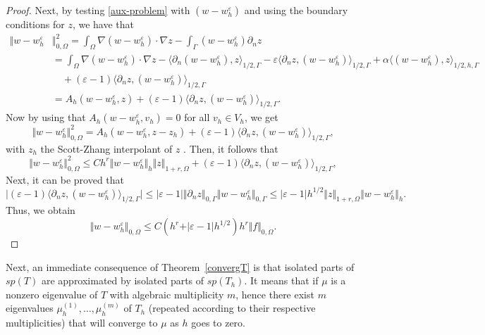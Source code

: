 \documentclass[onefignum,onetabnum,final]{siamart250211}
\numberwithin{equation}{section}
\newcommand\0{\boldsymbol{0}}
\renewcommand\O{\Omega}
\newcommand\G{\Gamma}
\begin{document}
\begin{proof}
		Next, by testing \eqref{aux-problem} with $(w-w_h^{\varepsilon})$
		and using the boundary conditions for $z$, we have that
		\begin{equation*}
			\begin{split}
				\Vert w-w^{\varepsilon}_h&\Vert_{0,\O}^2=\int_{\O}\nabla(w-w^{\varepsilon}_h)\cdot\nabla z-\int_{\G}(w-w^{\varepsilon}_h)\partial_nz\\
				&=\int_{\O}\nabla(w-w^{\varepsilon}_h)\cdot\nabla z- \langle \partial_n (w-w^{\varepsilon}_h),z \rangle_{1/2,\Gamma} - \varepsilon\langle \partial_n z,(w-w^{\varepsilon}_h) \rangle_{1/2,\Gamma} + \alpha\langle (w-w^{\varepsilon}_h),z \rangle_{1/2,h,\Gamma}\\
				&\quad+(\varepsilon-1)\langle \partial_n z,(w-w^{\varepsilon}_h)\rangle_{1/2,\Gamma}\\
				&=A_h(w-w^{\varepsilon}_h,z)+(\varepsilon-1)\langle \partial_n z,(w-w^{\varepsilon}_h)\rangle_{1/2,\Gamma}.
			\end{split}
		\end{equation*}
		Now by using that $A_h(w-w^{\varepsilon}_h,v_h)=0$ for all $v_h\in V_h$, we get
		$$
		\Vert w-w^{\varepsilon}_h\Vert_{0,\O}^2
		=A_h(w-w^{\varepsilon}_h,z-z_h)+(\varepsilon-1)\langle \partial_n z,(w-w^{\varepsilon}_h)\rangle_{1/2,\Gamma},
		$$
		with $z_h$ the Scott-Zhang interpolant of $z$ \cite{scott1990finite}. Then, it follows that
		$$
		\Vert w-w^{\varepsilon}_h\Vert_{0,\O}^2\le C h^r\Vert w-w^{\varepsilon}_h\Vert_h\Vert z\Vert_{1+r,\O}
		+(\varepsilon-1)\langle \partial_n z,(w-w^{\varepsilon}_h)\rangle_{1/2,\Gamma},
		$$
		Next, it can be proved that
		$$
		\vert (\varepsilon-1)\langle \partial_n z,(w-w^{\varepsilon}_h)\rangle_{1/2,\Gamma}\vert\le
		\vert\varepsilon-1\vert\Vert\partial_n z\Vert_{0,\G}\Vert w-w^{\varepsilon}_h\Vert_{0,\G}
		\le\vert\varepsilon-1\vert h^{1/2}\Vert z\Vert_{1+r,\O}\Vert w-w^{\varepsilon}_h\Vert_{h}.
		$$
		Thus, we obtain
		\begin{equation}\label{dfghtrf}
			\Vert w-w^{\varepsilon}_h\Vert_{0,\O}\le C (h^r+\vert\varepsilon-1\vert h^{1/2})h^r\Vert f\Vert_{0,\O}.
		\end{equation}
	\end{proof}
	
	
	Next, an immediate consequence of
	Theorem~\ref{convergT} is that isolated parts of $sp(T)$ are approximated
	by isolated parts of $sp(T_h)$.
	It means that if $\mu$ is a nonzero eigenvalue of $T$ with algebraic
	multiplicity $m$, hence there exist $m$ eigenvalues
	$\mu_h^{(1)},\ldots,\mu_h^{(m)}$ of $T_h$
	(repeated according to their respective multiplicities)
	that will converge to $\mu$ as $h$ goes to zero.
	
\end{document}
